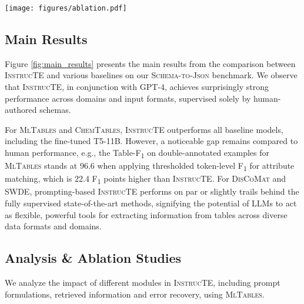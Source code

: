 \documentclass[11pt]{article}
\newcommand\method{\textsc{InstrucTE}}
\newcommand\task{\textsc{Schema-to-Json}}
\newcommand\data{\textsc{MlTables}}
\newcommand{\chemtables}{\textsc{ChemTables}}
\newcommand{\discomat}{\textsc{DisCoMat}}
\begin{document}
\begin{figure*}[t!]
    \centering
    \texttt{[image: figures/ablation.pdf]}
    \caption{Ablation studies on various components of our \textsc{InstrucTE} (w/ \texttt{code-davinci-002}) on the \data{} dataset. 
Interestingly, excluding the table caption improves performance. Our detailed analysis in Appendix \ref{sec:error_analysis_of_caption} reveals that low-quality captions (e.g., lack of specificity) may confuse the model, leading to inaccurate predictions.}
    \label{fig:ablation}
\end{figure*}


\subsection{Main Results}
\label{sec:main_results}
Figure \ref{fig:main_results} presents the main results from the comparison between \method{} and various baselines on our \task{} benchmark.
We observe that \method{}, in conjunction with GPT-4, achieves surprisingly strong performance across domains and input formats, supervised solely by human-authored schemas. 


For \data{} and \chemtables{}, \method{} outperforms all baseline models, including the fine-tuned T5-11B. However, a noticeable gap remains compared to human performance, e.g., the Table-F\textsubscript{1} on double-annotated examples for \data{} stands at 96.6 when applying thresholded token-level F\textsubscript{1} for attribute matching, which is 22.4 F\textsubscript{1} points higher than \method{}. 
For \discomat{} and SWDE, prompting-based \method{} performs on par or slightly trails behind the fully supervised state-of-the-art methods, signifying the potential of LLMs to act as flexible, powerful tools for extracting information from tables across diverse data formats and domains.






\subsection{Analysis \& Ablation Studies}
\label{sec:ablation}


We analyze the impact of different modules in \textsc{InstrucTE}, including prompt formulations, retrieved information and error recovery, using \data{}.
\end{document}
